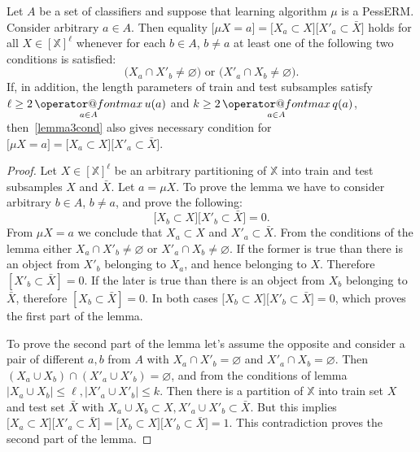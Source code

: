 \documentclass{article}
\makeatletter
\def\XX{\mathbb{X}}
\newcommand{\XXell}{[\XX]^\ell}
\newcommand{\X}{\bar X}
\renewcommand{\emptyset}{\varnothing}\newcommand{\emset}{\varnothing}
\renewcommand{\max}{\mathop{\operator@font max}\limits}
\makeatother
\begin{document}
\begin{lemma}
   \label{lemma3}
   Let $A$ be a set of classifiers and suppose that learning algorithm $\mu$ is a PessERM.
   Consider arbitrary $a \in A$.
   Then equality $\bigl[\mu X = a\bigr] = \bigl[X_{a} \subset X\bigr]\bigl[X'_{a} \subset \X\bigr]$
   holds for all $X \in \XXell$ whenever for each $b \in A$, $b \neq a$ at least one of the following two conditions is satisfied:
    \begin{equation}
        \label{lemma3cond}
        \bigl( X_{a} \cap X'_{b} \neq \emptyset \bigr)
        \text{~or~}
        \bigl( X'_{a} \cap X_{b} \neq \emptyset \bigr).
    \end{equation}
    If, in addition, the length parameters of train and test subsamples satisfy $\ell \ge 2\max\limits_{a \in A}u(a)$ and $k \ge 2\max\limits_{a \in A}q(a)$,
    then~\eqref{lemma3cond} also gives necessary condition for $\bigl[\mu X = a\bigr] = \bigl[X_{a} \subset X\bigr]\bigl[X'_{a} \subset \X\bigr]$.
\end{lemma}
\begin{proof}
Let $X \in \XXell$ be an arbitrary partitioning of $\XX$ into train and test subsamples $X$ and $\X$.
Let $a = \mu X$.
To prove the lemma we have to consider arbitrary $b \in A$, $b \neq a$, and prove the following:
\[
\bigl[X_{b} \subset X\bigr]\bigl[X'_{b} \subset \X\bigr] = 0.
\]
From $\mu X = a$ we conclude that $X_{a} \subset X$ and $X'_{a} \subset \X$.
From the conditions of the lemma either $X_{a} \cap X'_{b} \neq \emptyset$ or $X'_{a} \cap X_{b} \neq \emptyset$.
If the former is true than there is an object from $X'_b$ belonging to $X_a$, and hence belonging to $X$. Therefore $[X'_b \subset \X] = 0$.
If the later is true than there is an object from $X_b$ belonging to $\X$, therefore $[X_b \subset \X] = 0$.
In both cases $\bigl[X_{b} \subset X\bigr]\bigl[X'_{b} \subset \X\bigr] = 0$, which proves the first part of the lemma.

To prove the second part of the lemma let's assume the opposite and
consider a pair of different $a, b$ from $A$ with $X_{a} \cap X'_{b} = \emptyset$ and $X'_{a} \cap X_{b} = \emptyset$.
Then $(X_{a}\cup X_{b}) \cap (X'_{a}\cup X'_{b}) = \emptyset$, and from the conditions of lemma $|X_{a}\cup X_{b}| \le \ell, |X'_{a}\cup X'_{b}| \le k$.
Then there is a partition of $\XX$ into train set $X$ and test set $\X$ with $X_{a}\cup X_{b} \subset X, X'_{a}\cup X'_{b} \subset \X$.
But this implies $\bigl[X_{a} \subset X\bigr]\bigl[X'_{a} \subset \X\bigr] = \bigl[X_{b} \subset X\bigr]\bigl[X'_{b} \subset \X\bigr] = 1$.
This contradiction proves the second part of the lemma.
\end{proof}
\end{document}
